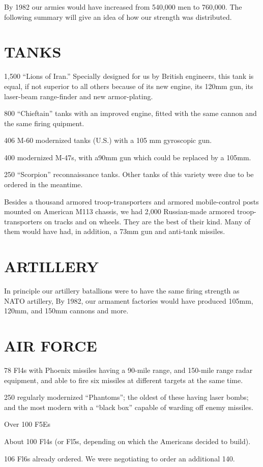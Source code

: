 By 1982 our armies would have increased from 540,000 men to 760,000. The following summary will give an idea of how our strength was distributed. 
\section*{TANKS}
1,500 “Lions of Iran.” Specially designed for us by British engineers, this tank is equal, if not superior to all others because of its new engine, its 120mm gun, its laser-beam range-finder and new armor-plating. 

800 “Chieftain” tanks with an improved engine, fitted with the same cannon and the same firing quipment. 

406 M-60 modernized tanks (U.S.) with a 105 mm gyroscopic gun. 

400 modernized M-47s, with a90mm gun which could be replaced by a 105mm. 

250 “Scorpion” reconnaissance tanks. Other tanks of this variety were due to be ordered in the meantime. 

Besides a thousand armored troop-transporters and armored mobile-control posts mounted on American M113 chassis, we had 2,000 Russian-made armored troop-transporters on tracks and on wheels. They are the best of their kind. Many of them would have had, in addition, a 73mm gun and anti-tank missiles. 
\section*{ARTILLERY}
In principle our artillery batallions were to have the same firing strength as NATO artillery, By 1982, our armament factories would have produced 105mm, 120mm, and 150mm cannons and more. 
\section*{AIR FORCE}
78 Fl4s with Phoenix missiles having a 90-mile range, and 150-mile range radar equipment, and able to fire six missiles at different targets at the same time. 

250 regularly modernized “Phantoms”; the oldest of these having laser bombs; and the most modern with a “black box” capable of warding off enemy missiles. 

Over 100 F5Es 

About 100 Fl4s (or Fl5s, depending on which the Americans decided to build). 

106 Fl6s already ordered. We were negotiating to order an additional 140. 

